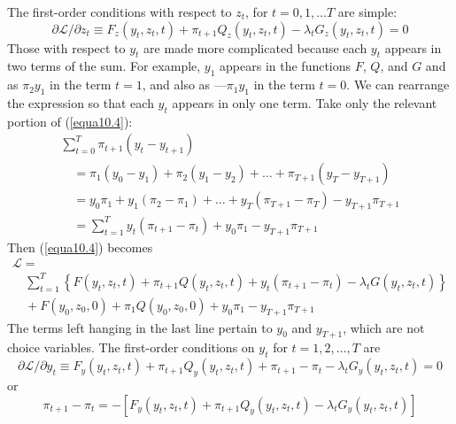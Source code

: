 The first-order conditions with respect to $z_t$, for $t = 0,1, \dots T$ are simple:
\begin{equation} \label{equa10.5}
\partial \mathcal{L} / \partial z_t \equiv  F_z(y_t, z_t, t) + \pi_{t+1} Q_z(y_t, z_t,t) -\lambda_t G_z(y_t, z_t, t)=0
\end{equation}
Those with respect to $y_t$ are made more complicated because each $y_t$ appears in two terms of the sum. For example, $y_1$ appears in the functions $F$, $Q$, and $G$ and as $\pi_2 y_1$ in the term $t = 1$, and also as $— \pi_1 y_1$ in the term $t = 0$. We can rearrange the expression so that each $y_t$ appears in only one term. Take only the relevant portion of (\ref{equa10.4}):
\begin{equation} \label{equa10.6}
\begin{array}{l}
\sum\limits_{t=0}^T  \pi_{t+1}  (y_t - y_{t+1}) \\
              \quad   =  \pi_1 (y_0 - y_1) + \pi_2 (y_1 - y_2) + \dots + \pi_{T+1} (y_T - y_{T+1}) \\
              \quad   =  y_0 \pi_1 + y_1 (\pi_2 - \pi_1) + \dots + y_T (\pi_{T+1} - \pi_T) - y_{T+1} \pi_{T+1} \\
              \quad   =  \sum\limits_{t=1}^T y_t (\pi_{t+1} - \pi_t) + y_0 \pi_1 - y_{T+1} \pi_{T+1}
\end{array}
\end{equation}
Then (\ref{equa10.4}) becomes
\begin{equation} \label{equa10.7}
\begin{array}{l}
\mathcal{L}  =  \\
 \quad \sum\limits_{t=1}^T  \left\{ F(y_t, z_t, t) + \pi_{t+1} Q(y_t, z_t, t) +  y_t (\pi_{t+1} - \pi_t) - \lambda_t G(y_t, z_t, t)  \right\}    \\
  \quad  +  F(y_0, z_0, 0) + \pi_1 Q(y_0, z_0, 0) + y_0 \pi_1 - y_{T+1} \pi_{T+1}
\end{array}
\end{equation}
The terms left hanging in the last line pertain to $y_0$ and $y_{T+1}$, which are not choice variables. The first-order conditions on $y_t$ for $t=1,2,\dots, T$ are
\begin{equation*}
\partial \mathcal{L} / \partial y_t \equiv F_y(y_t, z_t, t) + \pi_{t+1} Q_y(y_t, z_t, t) + \pi_{t+1} - \pi_t - \lambda_t G_y(y_t, z_t,t) =0
\end{equation*}
or
\begin{equation} \label{equa10.8}
\pi_{t+1} - \pi_t = -[ F_y(y_t, z_t, t) + \pi_{t+1} Q_y (y_t, z_t, t) - \lambda_t G_y(y_t, z_t, t)  ]
\end{equation}

